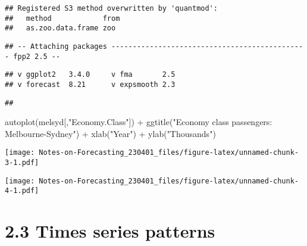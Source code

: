 \documentclass[
]{article}
\newenvironment{Shaded}{\begin{snugshade}}{\end{snugshade}}
\newcommand{\FunctionTok}[1]{\textcolor[rgb]{0.00,0.00,0.00}{#1}}
\newcommand{\NormalTok}[1]{#1}
\newcommand{\SpecialCharTok}[1]{\textcolor[rgb]{0.00,0.00,0.00}{#1}}
\newcommand{\StringTok}[1]{\textcolor[rgb]{0.31,0.60,0.02}{#1}}
\begin{document}
\begin{verbatim}
## Registered S3 method overwritten by 'quantmod':
##   method            from
##   as.zoo.data.frame zoo
\end{verbatim}

\begin{verbatim}
## -- Attaching packages ---------------------------------------------- fpp2 2.5 --
\end{verbatim}

\begin{verbatim}
## v ggplot2   3.4.0     v fma       2.5  
## v forecast  8.21      v expsmooth 2.3
\end{verbatim}

\begin{verbatim}
## 
\end{verbatim}

\begin{Shaded}
\begin{Highlighting}[]
\FunctionTok{autoplot}\NormalTok{(melsyd[,}\StringTok{"Economy.Class"}\NormalTok{]) }\SpecialCharTok{+}
  \FunctionTok{ggtitle}\NormalTok{(}\StringTok{"Economy class passengers: Melbourne{-}Sydney"}\NormalTok{) }\SpecialCharTok{+}
  \FunctionTok{xlab}\NormalTok{(}\StringTok{"Year"}\NormalTok{) }\SpecialCharTok{+}
  \FunctionTok{ylab}\NormalTok{(}\StringTok{"Thousands"}\NormalTok{)}
\end{Highlighting}
\end{Shaded}

\texttt{[image: Notes-on-Forecasting\_230401\_files/figure-latex/unnamed-chunk-3-1.pdf]}

\begin{Shaded}
\end{Shaded}

\texttt{[image: Notes-on-Forecasting\_230401\_files/figure-latex/unnamed-chunk-4-1.pdf]}

\hypertarget{times-series-patterns}{%
\section{2.3 Times series patterns}\label{times-series-patterns}}
\end{document}
